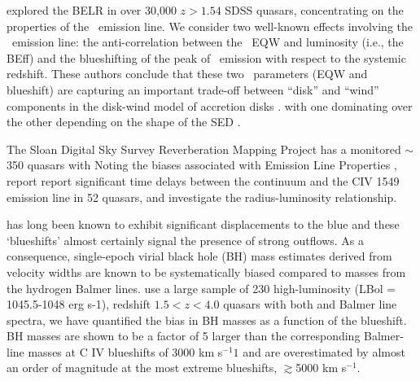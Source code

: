 \documentclass[a4paper,fleqn,usenatbib]{mnras}
\begin{document}
\citet{Richards2011} explored the BELR in over 30,000 $z > 1.54$ SDSS
quasars, concentrating on the properties of the \civ\ emission
line. We consider two well-known effects involving the \civ\ emission
line: the anti-correlation between the \civ\ EQW and luminosity (i.e.,
the BEff) and the blueshifting of the peak of \civ\ emission with
respect to the systemic redshift. These authors conclude that these
two \civ\ parameters (EQW and blueshift) are capturing an important
trade-off between ``disk'' and ``wind'' components in the disk-wind
model of accretion disks \citep[e.g.,][]{Murray1995, Elvis2000,
Proga2000}.  with one dominating over the other depending on the shape
of the SED \citep[][strong \civ EQW indicates a
more ionizing SED and large \civ blueshift indicating a less ionizing
SED]{Leighly2004b}.

The Sloan Digital Sky Survey Reverberation Mapping Project
\cite[(SDSS-RM)][]{Shen2015} has a monitored $\sim$350 quasars with
\civ Noting the biases associated with \civ Emission Line Properties
\citep[e.g. increasing systematic offsets with decreasing
signal-to-noise][]{Denney2016}, \citet{Grier2019} report report
significant time delays between the continuum and the CIV 1549
emission line in 52 quasars, and investigate the \civ
radius-luminosity relationship.

\civ has long been known to exhibit significant displacements to the blue and these `blueshifts' almost certainly signal the presence of strong outflows. As a consequence, single-epoch virial black hole (BH) mass estimates derived from \civ velocity widths are known to be systematically biased compared to masses from the hydrogen Balmer lines. 
\citet{Coatman2017} use a large sample of 230 high-luminosity (LBol = 1045.5-1048 erg s-1), redshift $1.5 < z < 4.0$ quasars with both \civ and Balmer line spectra, we have quantified the bias in \civ BH masses as a function of the \civ blueshift. \civ BH masses are shown to be a factor of 5 larger than the corresponding Balmer-line masses at C IV blueshifts of 3000 km s$^{-1}1$ and are overestimated by almost an order of magnitude at the most extreme blueshifts, $\gtrsim$5000 km s$^{-1}$. 
\end{document}
